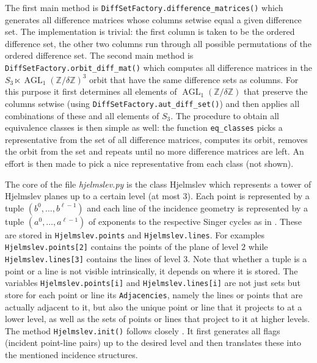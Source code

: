\documentclass[a4paper,11pt]{amsart}
\numberwithin{equation}{section}
\theoremstyle{plain}
\theoremstyle{definition}
\theoremstyle{remark}
\newcommand{\Z}{\mathbb{Z}}
\newcommand{\Aff}{\operatorname{AGL}}
\numberwithin{equation}{section}
\begin{document}
The first main method is \verb|DiffSetFactory.difference_matrices()| which generates all difference matrices whose columns setwise equal a given difference set. The implementation is trivial: the first column is taken to be the ordered difference set, the other two columns run through all possible permutations of the ordered difference set. The second main method is \verb|DiffSetFactory.orbit_diff_mat()| which computes all difference matrices in the $S_3 \ltimes \Aff_1(\Z/\delta\Z)^3$ orbit that have the same difference sets as columns. For this purpose it first determines all elements of $\Aff_1(\Z/\delta\Z)$ that preserve the columns setwise (using \verb|DiffSetFactory.aut_diff_set()|) and then applies all combinations of these and all elements of $S_3$. The procedure to obtain all equivalence classes is then simple as well:  the function \verb|eq_classes| picks a representative from the set of all difference matrices, computes its orbit, removes the orbit from the set and repeats until no more difference matrices are left. An effort is then made to pick a nice representative from each class (not shown).



The core of the file \emph{hjelmslev.py} is the class Hjelmslev which represents a tower of Hjelmslev planes up to a certain level (at most $3$). Each point is represented by a tuple  $(b^0, \ldots, b^{\ell-1})$ and each line of the incidence geometry is represented by a tuple $(a^0, \ldots, a^{\ell-1})$ of exponents to the respective Singer cycles as in \cite[Corollary~9.7]{witzel}. These are stored in \verb|Hjelmslev.points| and \verb|Hjelmslev.lines|. For examples \verb|Hjelmslev.points[2]| contains the points of the plane of level $2$ while \verb|Hjelmslev.lines[3]| contains the lines of level $3$. Note that whether a tuple is a point or a line is not visible intrinsically, it depends on where it is stored. The variables \verb|Hjelmslev.points[i]| and \verb|Hjelmslev.lines[i]| are not just sets but store for each point or line its \verb|Adjacencies|, namely the lines or points that are actually adjacent to it, but also the unique point or line that it projects to at a lower level, as well as the sets of points or lines that project to it at higher levels. The method \verb|Hjelmslev.init()| follows closely \cite[Corollary~9.7]{witzel}. It first generates all flags (incident point-line pairs) up to the desired level and then translates these into the mentioned incidence structures.
\end{document}
